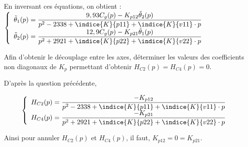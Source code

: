\begin{corrige}
En inversant ces équations, on obtient : 
$\left\{
\begin{array}{l}
\tilde{\theta}_1(p)=\dfrac{9,93C_g(p)-K_{p12}\tilde{\theta}_2(p)}{p^2-2338+\indice{K}{p11}+\indice{K}{v11}\cdot p}\\
\tilde{\theta}_2(p)=\dfrac{12,9C_g(p)-K_{p21}\tilde{\theta}_1(p)}{p^2+2921+\indice{K}{p22}+\indice{K}{v22}\cdot p}\\
\end{array}
\right.
$

\end{corrige}
\else
\fi

\begin{question}
\label{2023_ccs_psi_q_27}
Afin d'obtenir le découplage entre les axes, déterminer les valeurs des coefficients non diagonaux de $K_{p}$ permettant d'obtenir $H_{C 2}(p)=H_{C 4}(p)=0$.\\
\end{question}
\ifprof
\begin{corrige}
D'après la question précédente,

\begin{align*}
\left\{
\begin{array}{l}
H_{C2}(p)=\dfrac{-K_{p12}}{p^2-2338+\indice{K}{p11}+\indice{K}{v11}\cdot p}\\
H_{C4}(p)=\dfrac{-K_{p21}}{p^2+2921+\indice{K}{p22}+\indice{K}{v22}\cdot p}\\
\end{array}
\right.
\end{align*}

Ainsi pour annuler $H_{C2}(p)$ et $H_{C4}(p)$, il faut, $K_{p12}=0=K_{p21}$.
\end{corrige}
\else
\fi

